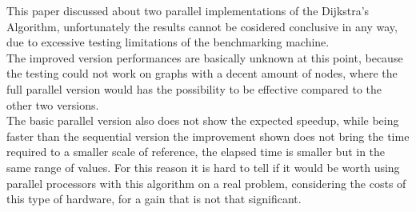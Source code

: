 \documentclass[
	a4paper, %
	12pt, %
]{class}
\begin{document}
This paper discussed about two parallel implementations of the Dijkstra's Algorithm, unfortunately the results cannot be cosidered conclusive in any way,
due to excessive testing limitations of the benchmarking machine. \\

The improved version performances are basically unknown at this point, because the testing could not work on graphs with a decent amount of nodes,
where the full parallel version would has the possibility to be effective compared to the other two versions. \\

The basic parallel version also does not show the expected speedup, while being faster than the sequential version the improvement shown does not bring the
time required to a smaller scale of reference, the elapsed time is smaller but in the same range of values. For this reason it is hard to tell if it would be worth using
parallel processors with this algorithm on a real problem, considering the costs of this type of hardware, for a gain that is not that significant. \\

\newpage
\printbibliography %

\end{document}
